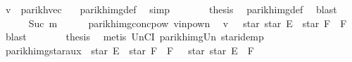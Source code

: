 \begin{isabellebody}
\ {\isachardoublequoteopen}v\ {\isacharequal}{\kern0pt}\ parikh{\isacharunderscore}{\kern0pt}vec\ {\isacharbrackleft}{\kern0pt}{\isacharbrackright}{\kern0pt}{\isachardoublequoteclose}\ \isamarkupfalse%
\ parikh{\isacharunderscore}{\kern0pt}img{\isacharunderscore}{\kern0pt}def\ \isamarkupfalse%
\ simp\isanewline
\ \ \ \ \isamarkupfalse%
\ \isamarkupfalse%
\ {\isacharquery}{\kern0pt}thesis\ \isamarkupfalse%
\ parikh{\isacharunderscore}{\kern0pt}img{\isacharunderscore}{\kern0pt}def\ \isamarkupfalse%
\ blast\isanewline
\ \ \isamarkupfalse%
\isanewline
\ \ \ \ \isamarkupfalse%
\ {\isacharparenleft}{\kern0pt}Suc\ m{\isacharparenright}{\kern0pt}\isanewline
\ \ \ \ \isamarkupfalse%
\ parikh{\isacharunderscore}{\kern0pt}img{\isacharunderscore}{\kern0pt}conc{\isacharunderscore}{\kern0pt}pow{}\ v{\isacharunderscore}{\kern0pt}in{\isacharunderscore}{\kern0pt}pow{\isacharunderscore}{\kern0pt}n\ \isamarkupfalse%
\ {\isachardoublequoteopen}v\ {\isasymin}\ {\isasymPsi}\ {\isacharparenleft}{\kern0pt}star\ {\isacharparenleft}{\kern0pt}star\ E{\isacharparenright}{\kern0pt}\ {\isacharat}{\kern0pt}{\isacharat}{\kern0pt}\ star\ F\ {\isacharat}{\kern0pt}{\isacharat}{\kern0pt}\ F{\isacharparenright}{\kern0pt}{\isachardoublequoteclose}\ \isamarkupfalse%
\ blast\isanewline
\ \ \ \ \isamarkupfalse%
\ \isamarkupfalse%
\ {\isacharquery}{\kern0pt}thesis\ \isamarkupfalse%
\ {\isacharparenleft}{\kern0pt}metis\ UnCI\ parikh{\isacharunderscore}{\kern0pt}img{\isacharunderscore}{\kern0pt}Un\ star{\isacharunderscore}{\kern0pt}idemp{\isacharparenright}{\kern0pt}\isanewline
\ \ \isamarkupfalse%
\isanewline
{}\isamarkupfalse%
%
\endisatagproof
{\isafoldproof}%
%
\isadelimproof
\isanewline
%
\endisadelimproof
\isanewline
{}\isamarkupfalse%
\ parikh{\isacharunderscore}{\kern0pt}img{\isacharunderscore}{\kern0pt}star{}{\isacharunderscore}{\kern0pt}aux{}{\isacharcolon}{\kern0pt}\ {\isachardoublequoteopen}{\isasymPsi}\ {\isacharparenleft}{\kern0pt}star\ E\ {\isacharat}{\kern0pt}{\isacharat}{\kern0pt}\ star\ F\ {\isacharat}{\kern0pt}{\isacharat}{\kern0pt}\ F{\isacharparenright}{\kern0pt}\ {\isasymsubseteq}\ {\isasymPsi}\ {\isacharparenleft}{\kern0pt}star\ {\isacharparenleft}{\kern0pt}star\ E\ {\isacharat}{\kern0pt}{\isacharat}{\kern0pt}\ F{\isacharparenright}{\kern0pt}{\isacharparenright}{\kern0pt}{\isachardoublequoteclose}\isanewline

\end{isabellebody}
